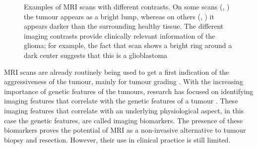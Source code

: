 \begin{figure}[hbt]
    \caption{Examples of \acrshort{MRI} scans with different contrasts. On some scans (\textbf{\protect{}}, \textbf{\protect{}}) the tumour appears as a bright lump, whereas on others (\textbf{\protect{}}, \textbf{\protect{}}) it appears darker than the surrounding healthy tissue. The different imaging contrasts provide clinically relevant information of the glioma; for example, the fact that scan \textbf{\protect{}} shows a bright ring around a dark center suggests that this is a glioblastoma}\label{fig:intro_MR_example}
\end{figure}

\gls{MRI} scans are already routinely being used to get a first indication of the aggressiveness of the tumour, mainly for tumour grading \autocite{upadhyay2011MRIevaluation}.
With the increasing importance of genetic features of the tumours, research has focused on identifying imaging features that correlate with the genetic features of a tumour \autocite{patel2017mismatch, smits2016imaging}.
These imaging features that correlate with an underlying physiological aspect, in this case the genetic features, are called imaging biomarkers.
The presence of these biomarkers proves the potential of \gls{MRI} as a non-invasive alternative to tumour biopsy and resection.
However, their use in clinical practice is still limited.

